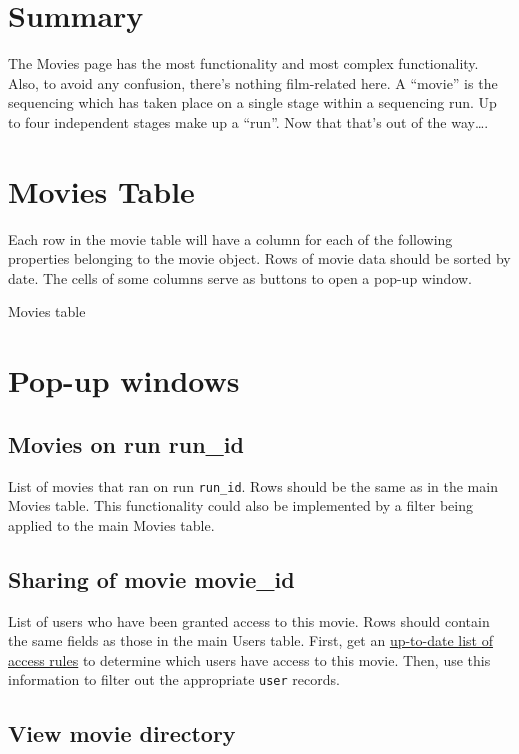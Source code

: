 
\section{Summary}
The Movies page has the most functionality and most complex functionality. Also, 
to avoid any confusion, there's nothing film-related here. A ``movie'' is the 
sequencing which has taken place on a single stage within a sequencing run. Up 
to four independent stages make up a ``run''. Now that that's out of the way….

\section{Movies Table}
Each row in the movie table will have a column for each of the following properties 
belonging to the movie object. Rows of movie data should be sorted by date. The 
cells of some columns serve as buttons to open a pop-up window.

\begin{table}[h]
    
    \caption{Movies table}
\end{table}

\section{Pop-up windows}

\subsection{Movies on run run\_id}
List of movies that ran on run \texttt{run\_id}. Rows should be the same as in the main 
Movies table. This functionality could also be implemented by a filter being applied 
to the main Movies table.

\subsection{Sharing of movie movie\_id}
List of users who have been granted access to this movie. Rows should contain the 
same fields as those in the main Users table. First, get an 
\hyperref[section:updatingcollectionaccessrules]{up-to-date list of access rules} 
to determine which users have access to this movie. Then, use this information 
to filter out the appropriate \texttt{user} records.

\subsection{View movie directory}

